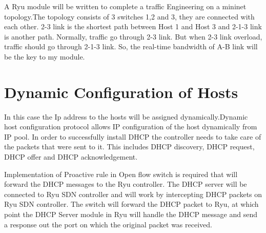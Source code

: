 A Ryu module will be written to complete a traffic Engineering on a mininet topology.The topology consists of 3 switches 1,2 and 3, they are connected with each other. 2-3 link is the shortest path between Host 1 and Host 3 and 2-1-3 link is another path. Normally, traffic go through 2-3 link. But when 2-3 link overload, traffic should go through 2-1-3 link. So, the real-time bandwidth of A-B link will be the key to my module.


\section{Dynamic Configuration of Hosts}

In this case the Ip address to the hosts will be assigned dynamically.Dynamic host configuration protocol allows IP configuration of the host dynamically from IP pool. In order to successfully install DHCP the controller needs to take care of the packets that were sent to it. This includes DHCP discovery, DHCP request, DHCP offer and DHCP acknowledgement.

Implementation of Proactive rule in Open flow switch is required that will forward the DHCP messages to the Ryu controller. The DHCP server will be connected to Ryu SDN controller and  will work by intercepting DHCP packets on Ryu SDN controller. The switch will forward the DHCP packet to Ryu, at which point the DHCP Server module in Ryu will handle the DHCP message and send a response out the port on which the original packet was received.

